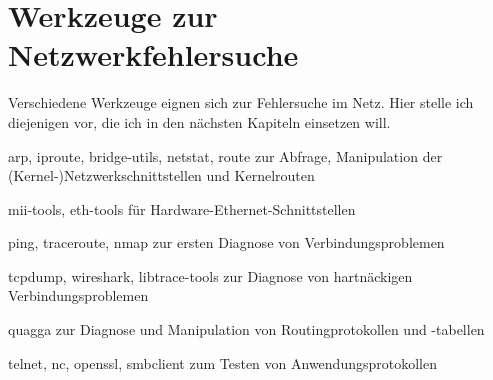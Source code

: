 \chapter{Werkzeuge zur Netzwerkfehlersuche}
\label{cha:netz-werkzeuge}

\begin{abstractsec}
  Verschiedene Werkzeuge eignen sich zur Fehlersuche im Netz. Hier stelle ich
  diejenigen vor, die ich in den nächsten Kapiteln einsetzen will.
\end{abstractsec}

\begin{notes}
\item[arp, iproute, bridge-utils, netstat, route] zur Abfrage,
  Manipulation der (Kernel-)Netzwerkschnittstellen und Kernelrouten
\item[mii-tools, eth-tools] für Hardware-Ethernet-Schnittstellen
\item[ping, traceroute, nmap] zur ersten Diagnose von Verbindungsproblemen
\item[tcpdump, wireshark, libtrace-tools] zur Diagnose von hartnäckigen
  Verbindungsproblemen
\item[quagga] zur Diagnose und Manipulation von Routingprotokollen und
  -tabellen
\item[telnet, nc, openssl, smbclient] zum Testen von Anwendungsprotokollen
\end{notes}

